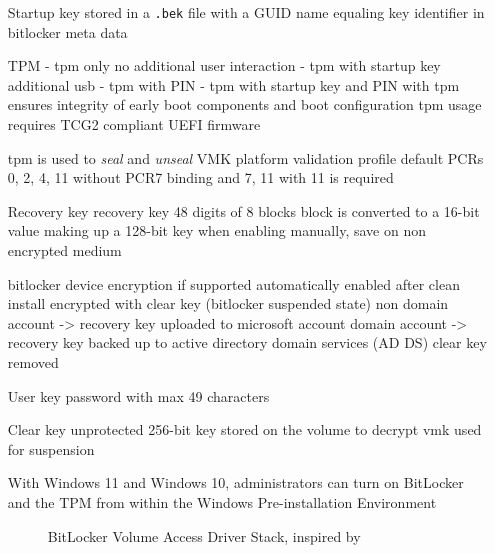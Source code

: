 \begin{itemize}
    \item[Startup key] stored in a \lstinline{.bek} file with a \ac{GUID} name equaling key identifier in bitlocker meta data
        \cite[2.6. Startup key]{bde-format-spec}
    \item[TPM]
        - tpm only
        no additional user interaction
        - tpm with startup key
        additional usb
        - tpm with PIN
        - tpm with startup key and PIN
        \cite{microsoft-bitlocker-countermeasures}
        with tpm ensures integrity of early boot components and boot configuration
        tpm usage requires \ac{TCG}2 compliant \ac{UEFI} firmware \cite[9. TPM]{windows-internals-6-part2}

        tpm is used to \emph{seal} and \emph{unseal} \ac{VMK}
        platform validation profile
        default \acp{PCR} 0, 2, 4, 11 without PCR7 binding and 7, 11 with
        11 is required
    \item[Recovery key] recovery key 48 digits of 8 blocks
        block is converted to a 16-bit value making up a 128-bit key
        \cite[2.4. Recovery key]{bde-format-spec}
        when enabling manually, save on non encrypted medium
        \cite{microsoft-bitlocker-basic-deployment}

        bitlocker device encryption if supported automatically enabled
        after clean install encrypted with clear key (bitlocker suspended state)
        non domain account -> recovery key uploaded to microsoft account
        domain account -> recovery key backed up to active directory domain services (AD DS)
        clear key removed
        \cite{microsoft-bitlocker-device-encryption}

    \item[User key] password with max 49 characters
        \cite[2.7. User key]{bde-format-spec}
    \item[Clear key] unprotected 256-bit key stored on the volume to decrypt vmk
        \cite[2.5. Clear key]{bde-format-spec}
        used for suspension


         With Windows 11 and Windows 10, administrators can turn on BitLocker and the TPM from within the Windows Pre-installation Environment \cite{microsoft-bitlocker-device-encryption}

        \begin{figure}[htb]%
            \centering
            
            \caption{BitLocker Volume Access Driver Stack, inspired by \cite[Figure 9-24]{windows-internals-6-part2}}%
            \label{fig:bitlocker-volume-access-driver-stack}%
        \end{figure}

\end{itemize}